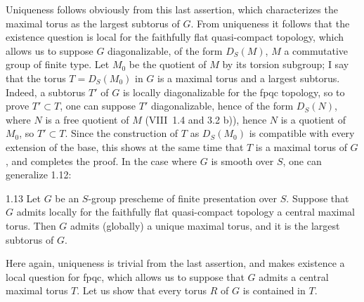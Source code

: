 Uniqueness follows obviously from this last assertion, which characterizes the maximal torus as the largest subtorus of $G$. From uniqueness it follows that the existence question is local for the faithfully flat quasi-compact topology, which allows us to suppose $G$ diagonalizable, \ie of the form $D_S(M)$, $M$ a commutative group of finite type. Let $M_0$ be the quotient of $M$ by its torsion subgroup; I say that the torus $T=D_S(M_0)$ in $G$ is a maximal torus and a largest subtorus. Indeed, a subtorus $T'$ of $G$ is locally diagonalizable for the fpqc topology, so to prove $T'\subset T$, one can suppose $T'$ diagonalizable, hence of the form $D_S(N)$, where $N$ is a free quotient of $M$ (VIII~1.4 and 3.2 b)), hence $N$ is a quotient of $M_0$, so $T'\subset T$. Since the construction of $T$ as $D_S(M_0)$ is compatible with every extension of the base, this shows at the same time that $T$ is a maximal torus of $G$, and completes the proof. In the case where $G$ is smooth over $S$, one can generalize 1.12:
\begin{proposition}{1.13}\label{XII.1.13}
Let $G$ be an $S$-group prescheme of finite presentation over $S$. Suppose that $G$ admits locally for the faithfully flat quasi-compact topology a central maximal torus. Then $G$ admits (globally) a unique maximal torus, and it is the largest subtorus of $G$.
\end{proposition}
Here again, uniqueness is trivial from the last assertion, and makes existence a local question for fpqc, which allows us to suppose that $G$ admits a central maximal torus $T$. Let us show that every torus $R$ of $G$ is contained in $T$.

